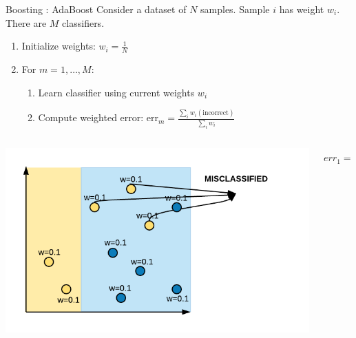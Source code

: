 \documentclass[aspectratio=169,10pt]{beamer}
\newcommand{\fitpic}[1]{\begin{adjustbox}{max width=\linewidth, max totalheight=0.78\textheight}#1\end{adjustbox}}
\begin{document}
\begin{frame}{Boosting : AdaBoost }
  Consider a dataset of $N$ samples. Sample $i$ has weight $w_i$. There are $M$ classifiers.\\[0.3cm]
  \begin{enumerate}
    \item Initialize weights: $w_i = \frac{1}{N}$
    \item For $m = 1, \ldots, M$:
          \begin{enumerate}
            \item Learn classifier using current weights $w_i$
            \item Compute weighted error: $\text{err}_m = \frac{\sum_i w_i(\text{incorrect})}{\sum_i w_i}$
          \end{enumerate}
  \end{enumerate}
  \begin{columns}
    \begin{column}{0.5\textwidth}\centering
      \fitpic{\includegraphics[width=1.1\textwidth]{../assets/ensemble/diagrams/ada_iter1_misclassify}}
    \end{column}
    \begin{column}{0.5\textwidth}
      $err_1 = \dfrac{0.3}{1}$
    \end{column}
  \end{columns}
\end{frame}
\end{document}

